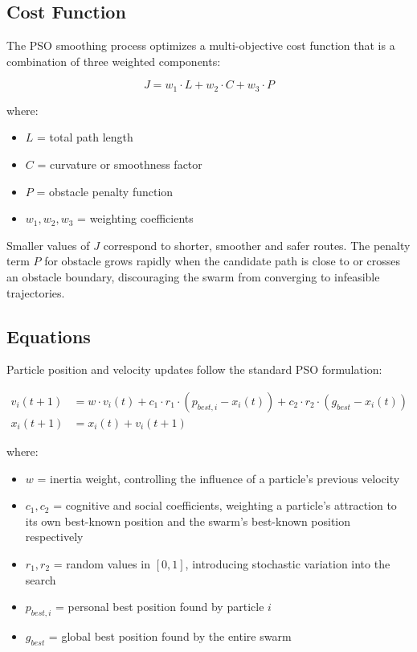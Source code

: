 \subsection{Cost Function}
\label{subsec:pso_cost_function}

The PSO smoothing process optimizes a multi-objective cost function that is a combination of three weighted components:

\begin{equation}
	J = w_1 \cdot L + w_2 \cdot C + w_3 \cdot P
	\label{eq:pso_cost_p2}
\end{equation}

where:
\begin{itemize}[noitemsep]
	\item $L$ = total path length
	\item $C$ = curvature or smoothness factor
	\item $P$ = obstacle penalty function
	\item $w_1, w_2, w_3$ = weighting coefficients
\end{itemize}

Smaller values of $J$ correspond to shorter, smoother and safer routes. The penalty term $P$ for obstacle grows rapidly when the candidate path is close to or crosses an obstacle boundary, discouraging the swarm from converging to infeasible trajectories.

\subsection{Equations}
\label{subsec:pso_equations}

Particle position and velocity updates follow the standard PSO formulation:

\begin{align}
	v_i(t+1) &= w \cdot v_i(t) + c_1 \cdot r_1 \cdot (p_{best,i} - x_i(t)) + c_2 \cdot r_2 \cdot (g_{best} - x_i(t)) \label{eq:pso_velocity_p2} \\
	x_i(t+1) &= x_i(t) + v_i(t+1) \label{eq:pso_position_p2}
\end{align}

where:
\begin{itemize}[noitemsep]
	\item $w$ = inertia weight, controlling the influence of a particle's previous velocity
	\item $c_1, c_2$ = cognitive and social coefficients, weighting a particle's attraction to its own best-known position and the swarm's best-known position respectively
	\item $r_1, r_2$ = random values in $[0,1]$, introducing stochastic variation into the search
	\item $p_{best,i}$ = personal best position found by particle $i$
	\item $g_{best}$ = global best position found by the entire swarm
\end{itemize}

